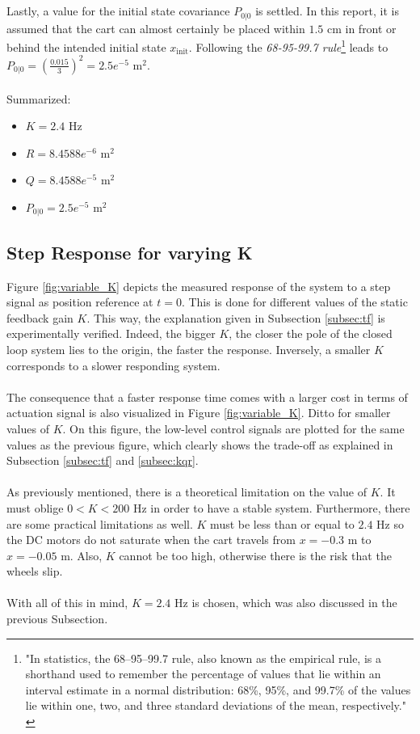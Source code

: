 \documentclass[a4paper,kul]{kulakarticle} %
\begin{document}
\\\\
Lastly, a value for the initial state covariance $P_{0|0}$ is settled. In this report, it is assumed that the cart can almost certainly be placed within $1.5$ cm in front or behind the intended initial state $x_{\text{init}}$. Following the \textit{68-95-99.7 rule}\footnote{"In statistics, the 68–95–99.7 rule, also known as the empirical rule, is a shorthand used to remember the percentage of values that lie within an interval estimate in a normal distribution: 68\%, 95\%, and 99.7\% of the values lie within one, two, and three standard deviations of the mean, respectively." \cite{68rule}} leads to $P_{0|0} = \left(\frac{0.015}{3}\right)^2 = 2.5e^{-5}$ m$^2$.
\\\\
Summarized:
\begin{multicols}{2}
	\begin{itemize}
		\item $K = 2.4$ Hz
		\item $R = 8.4588 e^{-6}$ m$^2$
		\item $Q = 8.4588 e^{-5}$ m$^2$
		\item $P_{0|0} = 2.5e^{-5}$ m$^2$
	\end{itemize}
\end{multicols}


\subsection{Step Response for varying K}
Figure \ref{fig:variable_K} depicts the measured response of the system to a step signal as position reference at $t = 0$. This is done for different values of the static feedback gain $K$. This way, the explanation given in Subsection \ref{subsec:tf} is experimentally verified. Indeed, the bigger $K$, the closer the pole of the closed loop system lies to the origin, the faster the response. Inversely, a smaller $K$ corresponds to a slower responding system.
\\\\
The consequence that a faster response time comes with a larger cost in terms of actuation signal is also visualized in Figure \ref{fig:variable_K}. Ditto for smaller values of $K$. On this figure, the low-level control signals are plotted for the same values as the previous figure, which clearly shows the trade-off as explained in Subsection \ref{subsec:tf} and \ref{subsec:kqr}.
\\\\
As previously mentioned, there is a theoretical limitation on the value of $K$. It must oblige $0 < K < 200$ Hz in order to have a stable system. Furthermore, there are some practical limitations as well. $K$ must be less than or equal to $2.4$ Hz so the DC motors do not saturate when the cart travels from $x = -0.3$ m to $x = -0.05$ m. Also, $K$ cannot be too high, otherwise there is the risk that the wheels slip. 
\\\\
With all of this in mind, $K = 2.4$ Hz is chosen, which was also discussed in the previous Subsection.
\end{document}
